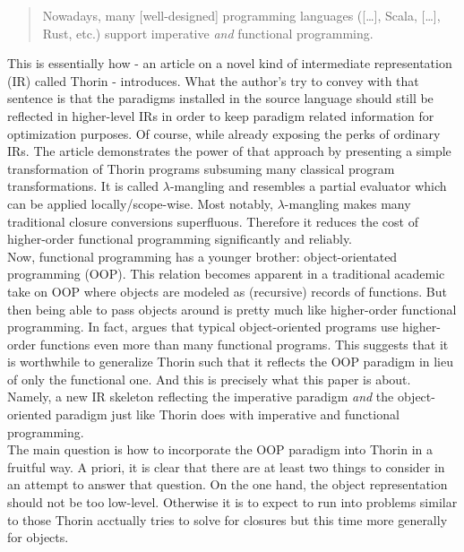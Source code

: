 \begin{quotation}
  Nowadays, many [well-designed] programming languages ([\ldots], Scala, [\ldots], Rust, etc.) support imperative \textit{and} functional programming.
\end{quotation}
This is essentially how \cite{7e4a991f} - an article on a novel kind of intermediate representation (IR) called Thorin - introduces.
What the author's try to convey with that sentence is that the paradigms installed in the source language should still be reflected in higher-level IRs in order to keep paradigm related information for optimization purposes.
Of course, while already exposing the perks of ordinary IRs.
The article demonstrates the power of that approach by presenting a simple transformation of Thorin programs subsuming {\glqq}many classical program transformations{\grqq}.
It is called $\lambda$-mangling and resembles a partial evaluator which can be applied locally/scope-wise.
Most notably, $\lambda$-mangling makes many traditional closure conversions superfluous. Therefore it reduces the cost of higher-order functional programming significantly and reliably.
\\
Now, functional programming has a younger brother: object-orientated programming (OOP).
This relation becomes apparent in a traditional academic take on OOP where objects are modeled as (recursive) records of functions.
But then being able to pass objects around is pretty much like higher-order functional programming.
In fact, \cite{cook09understanding} argues that typical object-oriented programs use higher-order functions even more than many functional programs.
This suggests that it is worthwhile to generalize Thorin such that it reflects the OOP paradigm in lieu of only the functional one.
And this is precisely what this paper is about.
Namely, a new IR skeleton reflecting the imperative paradigm \textit{and} the object-oriented paradigm just like Thorin does with imperative and functional programming.
\\
The main question is how to incorporate the OOP paradigm into Thorin in a fruitful way.
A priori, it is clear that there are at least two things to consider in an attempt to answer that question.
On the one hand, the object representation should not be too low-level.
Otherwise it is to expect to run into problems similar to those Thorin acctually tries to solve for closures but this time more generally for objects.

